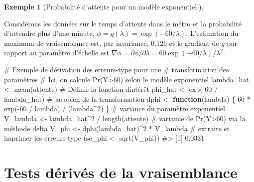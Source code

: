 \documentclass[
  11pt,
  letterpaper,
]{scrbook}
\newenvironment{Shaded}{\begin{snugshade}}{\end{snugshade}}
\newcommand{\CommentTok}[1]{\textcolor[rgb]{0.37,0.37,0.37}{#1}}
\newcommand{\ControlFlowTok}[1]{\textcolor[rgb]{0.00,0.23,0.31}{\textbf{#1}}}
\newcommand{\DecValTok}[1]{\textcolor[rgb]{0.68,0.00,0.00}{#1}}
\newcommand{\FunctionTok}[1]{\textcolor[rgb]{0.28,0.35,0.67}{#1}}
\newcommand{\NormalTok}[1]{\textcolor[rgb]{0.00,0.23,0.31}{#1}}
\newcommand{\OtherTok}[1]{\textcolor[rgb]{0.00,0.23,0.31}{#1}}
\newcommand{\SpecialCharTok}[1]{\textcolor[rgb]{0.37,0.37,0.37}{#1}}
\theoremstyle{plain}
\theoremstyle{plain}
\theoremstyle{definition}
\newtheorem{example}{Exemple}[chapter]
\theoremstyle{definition}
\theoremstyle{remark}
\begin{document}
\begin{example}[Probabilité d'attente pour un modèle
exponentiel.]\protect\hypertarget{exm-transformation-exp}{}\label{exm-transformation-exp}

Considérons les données sur le temps d'attente dans le métro et la
probabilité d'attendre plus d'une minute,
\(\phi=g(\lambda) = \exp(-60/\lambda).\) L'estimation du maximum de
vraisemblance est, par invariance, \(0.126\) et le gradient de \(g\) par
rapport au paramètre d'échelle est
\(\nabla \phi = \partial \phi / \partial \lambda = 60\exp(-60/\lambda)/\lambda^2.\)

\begin{Shaded}
\begin{Highlighting}[]
\CommentTok{\# Exemple de dérivation des erreurs{-}type pour une}
\CommentTok{\# transformation des paramètres}
\CommentTok{\# Ici, on calcule Pr(Y\textgreater{}60) selon le modèle exponentiel}
\NormalTok{lambda\_hat }\OtherTok{\textless{}{-}} \FunctionTok{mean}\NormalTok{(attente)}
\CommentTok{\# Définir la fonction d\textquotesingle{}intérêt}
\NormalTok{phi\_hat }\OtherTok{\textless{}{-}} \FunctionTok{exp}\NormalTok{(}\SpecialCharTok{{-}}\DecValTok{60} \SpecialCharTok{/}\NormalTok{ lambda\_hat)}
\CommentTok{\# jacobien de la transformation}
\NormalTok{dphi }\OtherTok{\textless{}{-}} \ControlFlowTok{function}\NormalTok{(lambda) \{}
  \DecValTok{60} \SpecialCharTok{*} \FunctionTok{exp}\NormalTok{(}\SpecialCharTok{{-}}\DecValTok{60} \SpecialCharTok{/}\NormalTok{ lambda) }\SpecialCharTok{/}\NormalTok{ (lambda}\SpecialCharTok{\^{}}\DecValTok{2}\NormalTok{)}
\NormalTok{\}}
\CommentTok{\# variance du paramètre exponentiel}
\NormalTok{V\_lambda }\OtherTok{\textless{}{-}}\NormalTok{ lambda\_hat}\SpecialCharTok{\^{}}\DecValTok{2} \SpecialCharTok{/} \FunctionTok{length}\NormalTok{(attente)}
\CommentTok{\# variance de Pr(Y\textgreater{}60) via la méthode delta}
\NormalTok{V\_phi }\OtherTok{\textless{}{-}} \FunctionTok{dphi}\NormalTok{(lambda\_hat)}\SpecialCharTok{\^{}}\DecValTok{2} \SpecialCharTok{*}\NormalTok{ V\_lambda}
\CommentTok{\# extraire et imprimer les erreurs{-}type}
\NormalTok{(se\_phi }\OtherTok{\textless{}{-}} \FunctionTok{sqrt}\NormalTok{(V\_phi))}
\CommentTok{\#\textgreater{} [1] 0.0331}
\end{Highlighting}
\end{Shaded}

\end{example}

\section{Tests dérivés de la vraisemblance}\label{sec-testsvrais}
\end{document}
